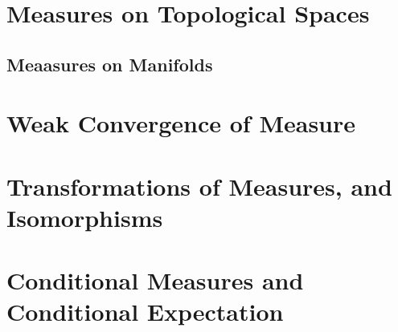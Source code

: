 \documentclass[Total.tex]{subfiles}
\begin{document}
	\chapter{Measures on Topological Spaces}
		\section{Meaasures on Manifolds}
	\chapter{Weak Convergence of Measure}
	\chapter{Transformations of Measures, and Isomorphisms}
	\chapter{Conditional Measures and Conditional Expectation}
		
\end{document}

